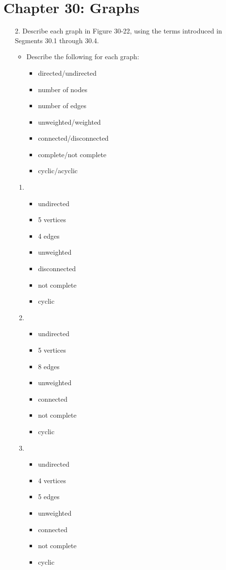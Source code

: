 \documentclass[10pt]{article}
\begin{document}
\section{Chapter 30: Graphs}
\begin{enumerate}
	\item[2.] Describe each graph in Figure 30-22, using the terms introduced in Segments 30.1 through 30.4.
		\begin{itemize}
			\item Describe the following for each graph:
				\begin{itemize}
					\item directed/undirected
					\item number of nodes
					\item number of edges
					\item unweighted/weighted
					\item connected/disconnected
					\item complete/not complete
					\item cyclic/acyclic
				\end{itemize}
		\end{itemize}
		
		\begin{enumerate}
			\item ~
				\begin{itemize}
					\item undirected
					\item 5 vertices
					\item 4 edges
					\item unweighted
					\item disconnected
					\item not complete
					\item cyclic
				\end{itemize}
			\item ~
				\begin{itemize}
					\item undirected
					\item 5 vertices
					\item 8 edges
					\item unweighted
					\item connected
					\item not complete
					\item cyclic
				\end{itemize}
			\item ~
				\begin{itemize}
					\item undirected
					\item 4 vertices
					\item 5 edges
					\item unweighted
					\item connected
					\item not complete
					\item cyclic
				\end{itemize}
		\end{enumerate}
	

\end{enumerate}
\end{document}

